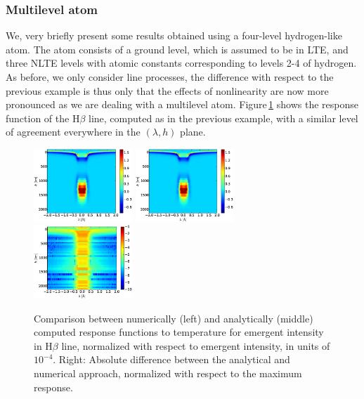 \documentclass[referee]{aa}
\begin{document}
\subsubsection{Multilevel atom}
We, very briefly present some results obtained using a four-level hydrogen-like atom. The atom consists of a ground level, which is assumed to be in LTE, and three NLTE levels with atomic constants corresponding to levels 2-4 of hydrogen. As before, we only consider line processes, the difference with respect to the previous example is thus only that the effects of nonlinearity are now more pronounced as we are dealing with a multilevel atom. Figure\,\ref{example_2} shows the response function of the H$\beta$ line, computed as in the previous example, with a similar level of agreement everywhere in the $(\lambda,h)$ plane.

\begin{figure}
 \includegraphics[width = 0.33\textwidth]{figs/ex_2_numerical_responses_intensity_temperature.eps}
 \includegraphics[width = 0.33\textwidth]{figs/ex_2_analytical_responses_intensity_temperature.eps}
 \includegraphics[width = 0.33\textwidth]{figs/ex_2_relative_difference_responses_intensity_temperature.eps}
 \caption{Comparison between numerically (left) and analytically (middle) computed response functions to temperature for emergent intensity in H$\beta$ line, normalized with respect to emergent intensity, in units of $10^{-4}$. Right: Absolute difference between the analytical and numerical approach, normalized with respect to the maximum response.}
 \label{example_2}
\end{figure}
\end{document}
